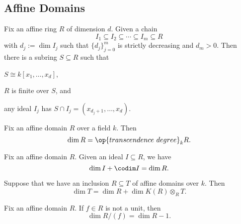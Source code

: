 \documentclass{article}
\begin{document}
\subsection{Affine Domains}
\begin{theorem*}[Theorem 13.3] \label{thm:noethernormal}
	Fix an affine ring $R$ of dimension $d$. Given a chain
	\[I_1\subseteq I_2\subseteq\cdots\subseteq I_m\subseteq R\]
	with $d_j:=\dim I_j$ such that $\{d_j\}_{j=0}^m$ is strictly decreasing and $d_m>0$. Then there is a subring $S\subseteq R$ such that
	\begin{listalph}
		\item $S\cong k[x_1,\ldots,x_d]$,
		\item $R$ is finite over $S$, and
		\item any ideal $I_j$ has $S\cap I_j=(x_{d_j+1},\ldots,x_d)$.
	\end{listalph}
\end{theorem*}
\begin{theorem*}[Theorem A]
	Fix an affine domain $R$ over a field $k$. Then
	\[\dim R=\op{transcendence~degree}_kR.\]
\end{theorem*}
\begin{corollary*}[Corollary 13.4]
	Fix an affine domain $R$. Given an ideal $I\subseteq R$, we have
	\[\dim I+\codim I=\dim R.\]
\end{corollary*}
\begin{corollary*}[Corollary 13.5]
	Suppose that we have an inclusion $R\subseteq T$ of affine domains over $k$. Then
	\[\dim T=\dim R+\dim K(R)\otimes_RT.\]
\end{corollary*}
\begin{cor*}[Corollary 13.11]
	Fix an affine domain $R$. If $f\in R$ is not a unit, then
	\[\dim R/(f)=\dim R-1.\]
\end{cor*}
\end{document}
